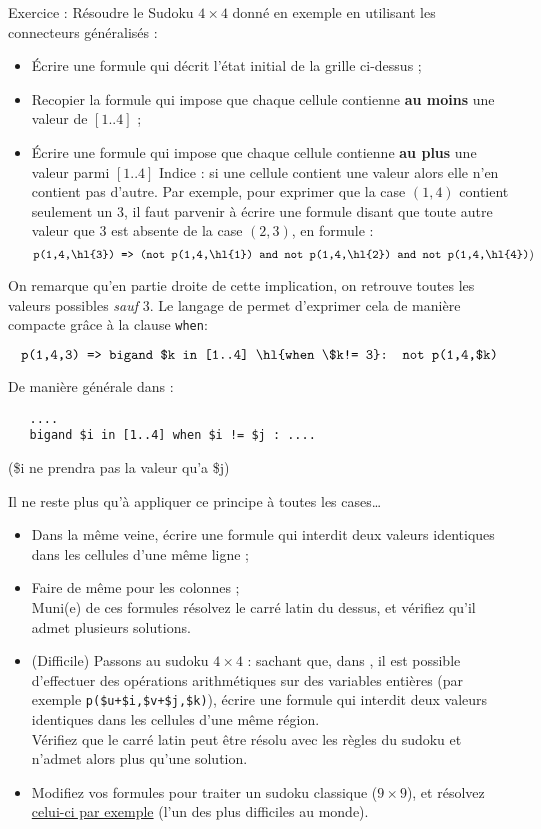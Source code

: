 Exercice : Résoudre le Sudoku $4\times 4$ donné en exemple en utilisant les connecteurs généralisés :
\begin{itemize}
	\item Écrire une formule qui décrit l'état initial de la grille ci-dessus ;
    \item Recopier la formule qui impose que chaque cellule contienne \textbf{au moins} une valeur de $[1..4]$ ;
	\item Écrire une formule qui impose que chaque cellule contienne \textbf{au plus} une valeur parmi $[1..4]$ 
Indice : si une cellule contient une valeur alors elle n'en contient pas d'autre. Par exemple, pour exprimer que la case $(1,4)$ contient seulement un 3, il faut parvenir à écrire une formule disant que toute autre valeur que 3 est absente de la case $(2,3)$, en formule : 
\[\texttt{p(1,4,\hl{3}) => (not p(1,4,\hl{1}) and not p(1,4,\hl{2}) and not p(1,4,\hl{4})})\]
\end{itemize}
On remarque qu'en partie droite de cette implication, on retrouve toutes les valeurs possibles \emph{sauf} 3. Le langage de \touist permet d'exprimer cela de manière compacte grâce à la clause \texttt{when}: 

\[\texttt{p(1,4,3) => bigand \$k in [1..4] \hl{when \$k!= 3}: not p(1,4,\$k)}\]

De manière générale dans : 
\begin{verbatim}
   ....
   bigand $i in [1..4] when $i != $j : ....
\end{verbatim}
(\$i ne prendra pas la valeur qu'a \$j)

Il ne reste plus qu'à appliquer ce principe à toutes les cases\ldots

\begin{itemize}
    \item Dans la même veine, écrire une formule qui interdit deux valeurs identiques dans les cellules d'une même ligne ;
    \item Faire de même pour les colonnes ;\\
    Muni(e) de ces formules résolvez le carré latin du dessus, et vérifiez qu'il admet plusieurs solutions. 
    \item (Difficile) Passons au sudoku $4\times 4$ : sachant que, dans \touist, il est possible d'effectuer des opérations arithmétiques sur des variables entières (par exemple \texttt{p(\$u+\$i,\$v+\$j,\$k)}), écrire une formule qui interdit deux valeurs identiques dans les cellules d'une même région.\\
    Vérifiez que le carré latin peut être résolu avec les règles du sudoku et n'admet alors plus qu'une solution. 
    
\item Modifiez vos formules pour traiter un sudoku classique ($9\times 9$), et résolvez \href{http://puzzling.stackexchange.com/questions/252/how-do-i-solve-the-worlds-hardest-sudoku}{celui-ci par exemple} (l'un des plus difficiles au monde). 
\end{itemize}

